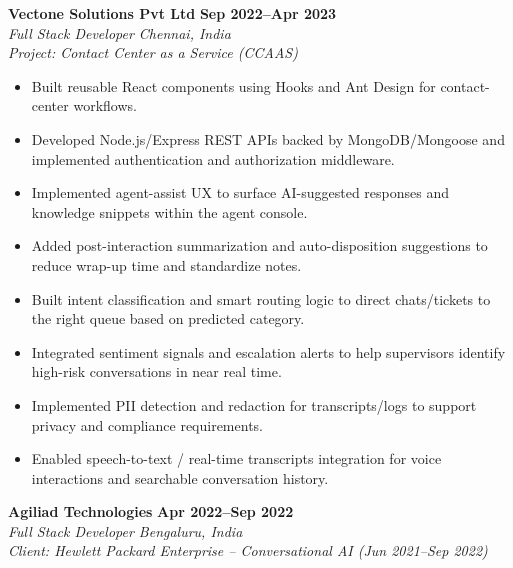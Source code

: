 \documentclass[10pt,a4paper]{article}
\begin{document}
\textbf{Vectone Solutions Pvt Ltd} \hfill \textbf{Sep 2022--Apr 2023}\\
\textit{Full Stack Developer \textbar{} Chennai, India}\\[-1pt]
\textit{Project: Contact Center as a Service (CCAAS)}
\begin{itemize}
  \item Built reusable React components using Hooks and Ant Design for contact-center workflows.
  \item Developed Node.js/Express REST APIs backed by MongoDB/Mongoose and implemented authentication and authorization middleware.
  \item Implemented agent-assist UX to surface AI-suggested responses and knowledge snippets within the agent console.
  \item Added post-interaction summarization and auto-disposition suggestions to reduce wrap-up time and standardize notes.
  \item Built intent classification and smart routing logic to direct chats/tickets to the right queue based on predicted category.
  \item Integrated sentiment signals and escalation alerts to help supervisors identify high-risk conversations in near real time.
  \item Implemented PII detection and redaction for transcripts/logs to support privacy and compliance requirements.
  \item Enabled speech-to-text / real-time transcripts integration for voice interactions and searchable conversation history.
\end{itemize}
\textbf{Agiliad Technologies} \hfill \textbf{Apr 2022--Sep 2022}\\
\textit{Full Stack Developer \textbar{} Bengaluru, India}\\[-1pt]
\textit{Client: Hewlett Packard Enterprise -- Conversational AI (Jun 2021--Sep 2022)}
\end{document}
